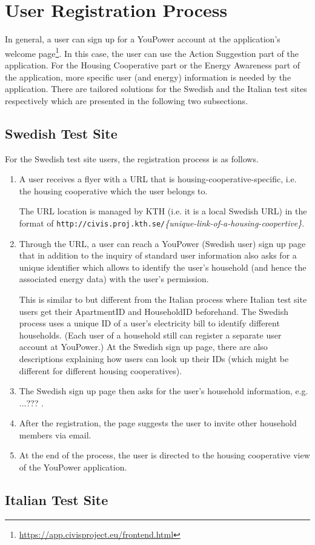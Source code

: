 \section{User Registration Process}

In general, a user can sign up for a YouPower account at the application's welcome page\footnote{\url{https://app.civisproject.eu/frontend.html}}. In this case, the user can use the Action Suggestion part of the application. For the Housing Cooperative part or the Energy Awareness part of the application, more specific user (and energy) information is needed by the application. There are tailored solutions for the Swedish and the Italian test sites respectively which are presented in the following two subsections. 

\subsection{Swedish Test Site}

For the Swedish test site users, the registration process is as follows. 

\begin{enumerate}
\item A user receives a flyer with a URL that is housing-cooperative-specific, i.e. the housing cooperative which the user belongs to. 

The URL location is managed by KTH (i.e. it is a local Swedish URL) in the format of  \texttt{\small http://civis.proj.kth.se/}\textit{\{unique-link-of-a-housing-coopertive\}}. 

\item Through the URL, a user can reach a YouPower (Swedish user) sign up page that in addition to the inquiry of standard user information also asks for a unique identifier which allows to identify the user's household (and hence the associated energy data) with the user's permission. 

This is similar to but different from the Italian process where Italian test site users get their ApartmentID and HouseholdID beforehand. The Swedish process uses a unique ID of a user's electricity bill to identify different households. (Each user of a household still can register a separate user account at YouPower.) At the Swedish sign up page, there are also descriptions explaining how users can look up their IDs (which might be different for different housing cooperatives). 

\item The Swedish sign up page then asks for the user's household information, e.g. ...??? . 

\item After the registration, the page suggests the user to invite other household members via email.

\item At the end of the process, the user is directed to the housing cooperative view of the YouPower application. 

\end{enumerate}

\subsection{Italian Test Site}